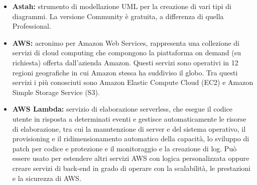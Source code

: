 \begin{itemize}
	\item \textbf{Astah:} strumento di modellazione UML per la creazione di vari tipi di diagrammi. La versione Community è gratuita, a differenza di quella Professional.
	\item \textbf{AWS:} acronimo per Amazon Web Services, rappresenta una collezione di servizi di cloud computing che compongono la piattaforma on demand (su richiesta) offerta dall'azienda Amazon. Questi servizi sono operativi in 12 regioni geografiche in cui Amazon stessa ha suddiviso il globo. Tra questi servizi i più conosciuti sono Amazon Elastic Compute Cloud (EC2) e Amazon Simple Storage Service (S3).
	\item \textbf{AWS Lambda:} servizio di elaborazione serverless, che esegue il codice utente in risposta a determinati eventi e gestisce automaticamente le risorse di elaborazione, tra cui la manutenzione di server e del sistema operativo, il provisioning e il ridimensionamento automatico della capacità, lo sviluppo di patch per codice e protezione e il monitoraggio e la creazione di log. Può essere usato per estendere altri servizi AWS con logica personalizzata oppure creare servizi di back-end in grado di operare con la scalabilità, le prestazioni e la sicurezza di AWS.
\end{itemize}
